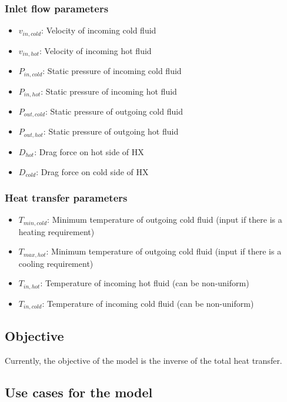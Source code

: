 \documentclass{article}
\begin{document}
\subsubsection{Inlet flow parameters}

\begin{itemize}
\item $v_{in, cold}$: Velocity of incoming cold fluid
\item $v_{in, hot}$: Velocity of incoming hot fluid
\item $P_{in, cold}$: Static pressure of incoming cold fluid
\item $P_{in, hot}$: Static pressure of incoming hot fluid
\item $P_{out, cold}$: Static pressure of outgoing cold fluid
\item $P_{out, hot}$: Static pressure of outgoing hot fluid
\item $D_{hot}$: Drag force on hot side of HX
\item $D_{cold}$: Drag force on cold side of HX
\end{itemize}

\subsubsection{Heat transfer parameters}

\begin{itemize}
	\item $T_{min,cold}$: Minimum temperature of outgoing cold fluid (input if there is a heating requirement)
	\item $T_{max, hot}$: Minimum temperature of outgoing cold fluid (input if there is a cooling requirement)
	\item $T_{in, hot}$: Temperature of incoming hot fluid (can be non-uniform)
	\item $T_{in, cold}$: Temperature of incoming cold fluid (can be non-uniform)
\end{itemize}

\subsection{Objective}

Currently, the objective of the model is the inverse of the total heat transfer. 

\subsection{Use cases for the model}
\end{document}
